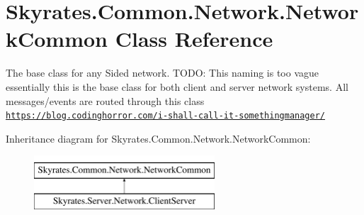 \hypertarget{class_skyrates_1_1_common_1_1_network_1_1_network_common}{\section{Skyrates.\-Common.\-Network.\-Network\-Common Class Reference}
\label{class_skyrates_1_1_common_1_1_network_1_1_network_common}
}


The base class for any Sided network. T\-O\-D\-O\-: This naming is too vague essentially this is the base class for both client and server network systems. All messages/events are routed through this class \href{https://blog.codinghorror.com/i-shall-call-it-somethingmanager/}{\tt https\-://blog.\-codinghorror.\-com/i-\/shall-\/call-\/it-\/somethingmanager/}  


Inheritance diagram for Skyrates.\-Common.\-Network.\-Network\-Common\-:\begin{figure}[H]
\begin{center}
\leavevmode
\includegraphics[height=2.000000cm]{class_skyrates_1_1_common_1_1_network_1_1_network_common}
\end{center}
\end{figure}
